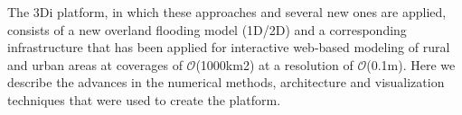 \documentclass[a4paper]{article}
\DeclareRobustCommand{\orderof}{\ensuremath{\mathcal{O}}}
\DeclareRobustCommand{\threedi}{3Di }
\begin{document}
The \threedi  platform, in which these approaches and several new ones are applied, consists of a new overland flooding model (1D/2D) and a corresponding infrastructure that has been applied for interactive web-based modeling of rural and urban areas at coverages of \orderof(1000km2) at a resolution of \orderof(0.1m). Here we describe the advances in the numerical methods, architecture and visualization techniques that were used to create the platform.

\end{document}
